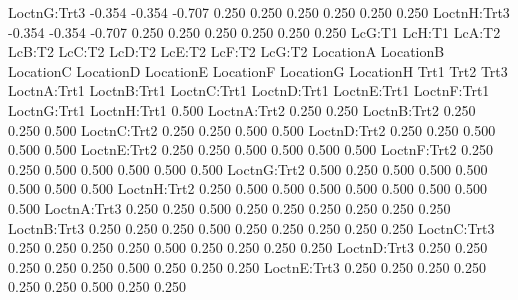 \documentclass[12pt]{article}
\begin{document}
\begin{Schunk}
\begin{Soutput}
LoctnG:Trt3 -0.354 -0.354 -0.707  0.250  0.250  0.250  0.250  0.250  0.250
LoctnH:Trt3 -0.354 -0.354 -0.707  0.250  0.250  0.250  0.250  0.250  0.250
            LcG:T1 LcH:T1 LcA:T2 LcB:T2 LcC:T2 LcD:T2 LcE:T2 LcF:T2 LcG:T2
LocationA                                                                 
LocationB                                                                 
LocationC                                                                 
LocationD                                                                 
LocationE                                                                 
LocationF                                                                 
LocationG                                                                 
LocationH                                                                 
Trt1                                                                      
Trt2                                                                      
Trt3                                                                      
LoctnA:Trt1                                                               
LoctnB:Trt1                                                               
LoctnC:Trt1                                                               
LoctnD:Trt1                                                               
LoctnE:Trt1                                                               
LoctnF:Trt1                                                               
LoctnG:Trt1                                                               
LoctnH:Trt1  0.500                                                        
LoctnA:Trt2  0.250  0.250                                                 
LoctnB:Trt2  0.250  0.250  0.500                                          
LoctnC:Trt2  0.250  0.250  0.500  0.500                                   
LoctnD:Trt2  0.250  0.250  0.500  0.500  0.500                            
LoctnE:Trt2  0.250  0.250  0.500  0.500  0.500  0.500                     
LoctnF:Trt2  0.250  0.250  0.500  0.500  0.500  0.500  0.500              
LoctnG:Trt2  0.500  0.250  0.500  0.500  0.500  0.500  0.500  0.500       
LoctnH:Trt2  0.250  0.500  0.500  0.500  0.500  0.500  0.500  0.500  0.500
LoctnA:Trt3  0.250  0.250  0.500  0.250  0.250  0.250  0.250  0.250  0.250
LoctnB:Trt3  0.250  0.250  0.250  0.500  0.250  0.250  0.250  0.250  0.250
LoctnC:Trt3  0.250  0.250  0.250  0.250  0.500  0.250  0.250  0.250  0.250
LoctnD:Trt3  0.250  0.250  0.250  0.250  0.250  0.500  0.250  0.250  0.250
LoctnE:Trt3  0.250  0.250  0.250  0.250  0.250  0.250  0.500  0.250  0.250

\end{Soutput}
\end{Schunk}
\end{document}

